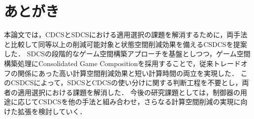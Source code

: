 \section{あとがき}
\label{section:conclusion}
本論文では，CDCSとSDCSにおける適用選択の課題を解消するために，両手法と比較して同等以上の削減可能対象と状態空間削減効果を備えるCSDCSを提案した．
SDCSの段階的なゲーム空間構築アプローチを基盤としつつ，ゲーム空間構築処理にConsolidated Game Compositionを採用することで，従来トレードオフの関係にあった高い計算空間削減効果と短い計算時間の両立を実現した．
このCSDCSによって，SDCSとCDCSの使い分けに関する判断工程を不要とし，両者の適用選択における課題を解消した．
今後の研究課題としては，制御器の用途に応じてCSDCSを他の手法と組み合わせ，さらなる計算空間削減の実現に向けた拡張を検討していく．